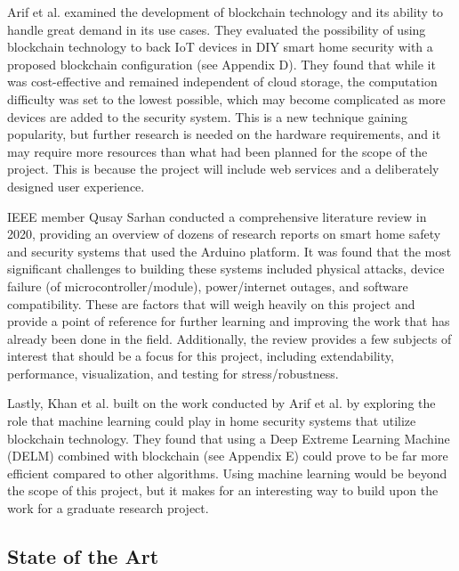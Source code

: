\documentclass[conference]{IEEEtran}
\begin{document}
Arif et al. examined the development of blockchain technology and its ability to
handle great demand in its use cases. They evaluated the possibility of using blockchain
technology to back IoT devices in DIY smart home security with a proposed blockchain
configuration (see Appendix D). They found that while it was cost-effective and remained
independent of cloud storage, the computation difficulty was set to the lowest possible,
which may become complicated as more devices are added to the security system.\cite{arifEtAl_2020}
This is a new technique gaining popularity, but further research is needed on the hardware
requirements, and it may require more resources than what had been planned for the scope
of the project. This is because the project will include web services and a deliberately
designed user experience.

IEEE member Qusay Sarhan conducted a comprehensive literature review in 2020, providing
an overview of dozens of research reports on smart home safety and security systems that
used the Arduino platform. It was found that the most significant challenges to building
these systems included physical attacks, device failure (of microcontroller/module),
power/internet outages, and software compatibility.\cite{sarhan2020} These are factors that will weigh
heavily on this project and provide a point of reference for further learning and
improving the work that has already been done in the field. Additionally, the review
provides a few subjects of interest that should be a focus for this project, including
extendability, performance, visualization, and testing for stress/robustness.\cite{sarhan2020}

Lastly, Khan et al. built on the work conducted by Arif et al. by exploring the role that
machine learning could play in home security systems that utilize blockchain technology.
They found that using a Deep Extreme Learning Machine (DELM) combined with
blockchain (see Appendix E) could prove to be far more efficient compared to other
algorithms.\cite{khanEtAl2021} Using machine learning would be beyond the scope of this project,
but it makes for an interesting way to build upon the work for a graduate research project.

\subsection{State of the Art}
\end{document}
